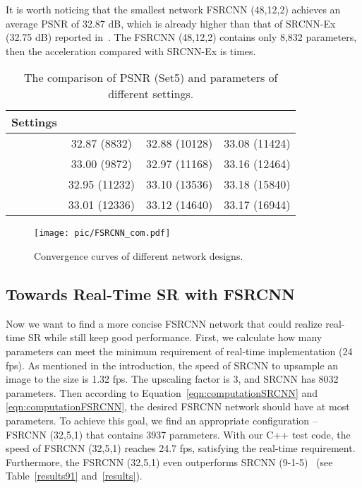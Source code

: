 \documentclass[runningheads]{llncs}
\begin{document}
It is worth noticing that the smallest network FSRCNN (48,12,2) achieves an average PSNR of 32.87 dB, which is already higher than that of SRCNN-Ex (32.75 dB) reported in~\cite{Dong2015}. The FSRCNN (48,12,2) contains only 8,832 parameters, then the acceleration compared with SRCNN-Ex is  times.



\begin{table}[t]
\caption{The comparison of PSNR (Set5) and parameters of different settings.}\label{tab:settings}
\begin{center}
\begin{tabular}{|c|c|c|c|}
\hline
  Settings &   &  &  \\

\hline
 & 32.87 (8832) & 32.88 (10128) & 33.08 (11424)\\
\hline
 & 33.00 (9872) & 32.97 (11168) & 33.16 (12464)\\
\hline
 & 32.95 (11232) & 33.10 (13536) & 33.18 (15840)\\
\hline
 & 33.01 (12336) & 33.12 (14640) & 33.17 (16944)\\
\hline

\end{tabular}
\end{center}
\vspace{-0.45cm}
\end{table}

\begin{figure}[t]\footnotesize
\centering
  \texttt{[image: pic/FSRCNN\_com.pdf]}
\caption{Convergence curves of different network designs.}
  \label{fig:com}
\end{figure}

\subsection{Towards Real-Time SR with FSRCNN}
Now we want to find a more concise FSRCNN network that could realize real-time SR while still keep good performance. First, we calculate how many parameters can meet the minimum requirement of real-time implementation (24 fps). As mentioned in the introduction, the speed of SRCNN to upsample an image to the size  is 1.32 fps. The upscaling factor is 3, and SRCNN has 8032 parameters. Then according to Equation~\ref{eqn:computationSRCNN} and \ref{eqn:computationFSRCNN}, the desired FSRCNN network should have at most  parameters. To achieve this goal, we find an appropriate configuration --  FSRCNN (32,5,1) that contains 3937 parameters. With our C++ test code, the speed of FSRCNN (32,5,1) reaches 24.7 fps, satisfying the real-time requirement. Furthermore, the FSRCNN (32,5,1) even outperforms SRCNN (9-1-5)~\cite{Dong2014} (see Table~\ref{results91} and~\ref{results}). 
\end{document}
